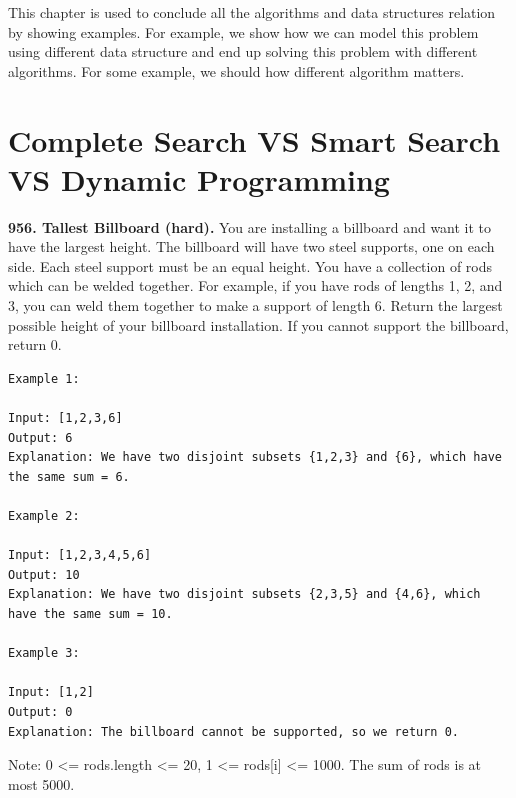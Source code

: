 \documentclass[../algorithms.tex]{subfiles}
\begin{document}
This chapter is used to conclude all the algorithms and data structures relation by showing examples. For example, we show how we can model this problem using different data structure and end up solving this problem with different algorithms. For some example, we should how different algorithm matters. 
\section{Complete Search VS Smart Search VS Dynamic Programming}
\begin{examples}
\item \textbf{956. Tallest Billboard (hard).} You are installing a billboard and want it to have the largest height.  The billboard will have two steel supports, one on each side.  Each steel support must be an equal height. You have a collection of rods which can be welded together.  For example, if you have rods of lengths 1, 2, and 3, you can weld them together to make a support of length 6. Return the largest possible height of your billboard installation.  If you cannot support the billboard, return 0.
\begin{lstlisting}[numbers=none]
Example 1:

Input: [1,2,3,6]
Output: 6
Explanation: We have two disjoint subsets {1,2,3} and {6}, which have the same sum = 6.

Example 2:

Input: [1,2,3,4,5,6]
Output: 10
Explanation: We have two disjoint subsets {2,3,5} and {4,6}, which have the same sum = 10.

Example 3:

Input: [1,2]
Output: 0
Explanation: The billboard cannot be supported, so we return 0.
\end{lstlisting}
Note: 0 <= rods.length <= 20, 1 <= rods[i] <= 1000. The sum of rods is at most 5000.


\end{examples}
\end{document}
